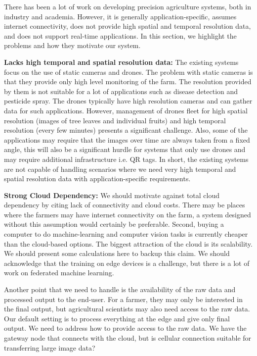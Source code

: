 There has been a lot of work on developing precision agriculture systems, both in industry and academia. 
However, it is generally application-specific, assumes internet connectivity, does not provide high spatial and temporal resolution data, and does not support real-time applications. 
In this section, we highlight the problems and how they motivate our system. 


\noindent
\textbf{Lacks high temporal and spatial resolution data:}
The existing systems focus on the use of static cameras and drones. 
The problem with static cameras is that they provide only high level monitoring of the farm. The resolution provided by them is not suitable for a lot of applications such as disease detection and pesticide spray. The drones typically have high resolution cameras and can gather data for such applications. However, management of drones fleet for high spatial resolution (images of tree leaves and individual fruits) and high temporal resolution (every few minutes) presents a significant challenge. Also, some of the applications may require that the images over time are always taken from a fixed angle, this will also be a significant hurdle for systems that only use drones and may require additional infrastructure i.e. QR tags. 
In short, the existing systems are not capable of handling scenarios where we need very high temporal and spatial resolution data with application-specific requirements. 

\noindent
\textbf{Strong Cloud Dependency:}
We should motivate against total cloud dependency by citing lack of connectivity and cloud costs. There may be places where the farmers may have internet connectivity on the farm, a system designed without this assumption would certainly be preferable. 
Second, buying a computer to do machine-learning and computer vision tasks is currently cheaper than the cloud-based options. The biggest attraction of the cloud is its scalability. 
We should present some calculations here to backup this claim. 
We should acknowledge that the training on edge devices is a challenge, but there is a lot of work on federated machine learning. 

Another point that we need to handle is the availability of the raw data and processed output to the end-user. For a farmer, they may only be interested in the final output, but agricultural scientists may also need access to the raw data. Our default setting is to process everything at the edge and give only final output. We need to address how to provide access to the raw data. We have the gateway node that connects with the cloud, but is cellular connection suitable for transferring large image data?

